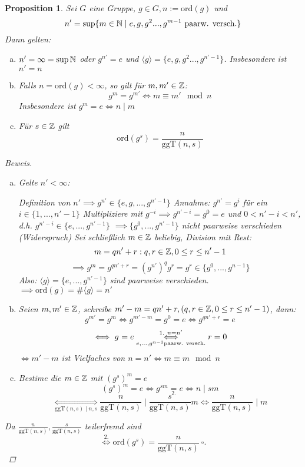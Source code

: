 \documentclass[a4paper]{article}
\theoremstyle{plain}
\newtheorem{prop}[thm]{Proposition}
\theoremstyle{definition}
\begin{document}
\begin{prop} %
Sei $G$ eine Gruppe, $g \in G, n := \mathrm{ord}(g)$ und
$$n' = \sup\{m \in \Bbb N \mid e, g, g^{2} ..., g^{m-1} \text{ paarw. versch.}\}$$
Dann gelten:
\begin{enumerate}[(a)]
\item $n' = \infty = \sup \Bbb N$ oder $g^{n'} = e$ und $\langle g \rangle= \{e, g, g^{2} ..., g^{n'-1}\}$. Insbesondere ist $n'=n$
\item Falls $n = \mathrm{ord}(g) < \infty$, so gilt für $m,m' \in \Bbb Z$: $$g^{m} = g^{m'} \iff m \equiv m' \mod n$$
    Insbesondere ist $g^{m} = e \iff n \mid m$
\item Für $s \in \Bbb Z$ gilt $$\mathrm{ord}(g^{s}) = \frac{n}{\mathrm{ggT}(n,s)}$$
\end{enumerate}
\begin{proof}[Beweis]
  \item
  \begin{enumerate}[(a)]
    \item Gelte $n' < \infty$:

Definition von $n' \implies g^{n'} \in \{e, g, ..., g^{n'-1}\}$
Annahme: $g^{n'} = g^{i}$ für ein $i \in \{1, ..., n'-1\}$
Multipliziere mit $g^{-i} \implies g^{n'-i} = g^{0} = e$ und
$0 < n' - i < n'$, d.h. $g^{n'-i} \in \{e, ..., g^{n'-1}\}$
$\implies \{g^{0}, ..., g^{n'-1}\}$ nicht paarweise verschieden (Widerspruch)
Sei schließlich $m \in \Bbb Z$ beliebig, Division mit Rest: $$m = qn' + r : q,r \in \Bbb Z , 0 \le r \le n' - 1$$
$$\implies g^{m} = g^{qn'+r} = (g^{n'})^{q}g^{r} = g^{r} \in \{g^{0}, ..., g^{n-1}\}$$
Also: $\langle g \rangle = \{e, ..., g^{n'-1}\}$ sind paarweise verschieden. $\implies \mathrm{ord}(g) = \# \langle g \rangle = n'$
\item Seien $m, m' \in \Bbb Z$, schreibe $m'-m = qn'+r, (q, r \in \Bbb Z, 0 \le r \le n'-1)$, dann:
$$g^{m'} = g^{m} \iff g^{m'-m} = g^{0} = e \iff g^{qn'+r} = e$$
$$\iff g^{} = e \overunderset{1.\  n = n'}{e, ..., g^{n-1} \text{paarw. versch.}}\iff r = 0$$
$\iff m' - m$ ist Vielfaches von $n=n' \iff m \equiv m \mod n$
\item Bestime die $m \in \Bbb Z$ mit $(g^{s})^{m} = e$
$$(g^{s})^{m} = e \iff g^{sm} \underset{2.}= e \iff n \mid sm$$
$$\underset{\mathrm{ggT}(n,s) \mid n,s}\iff \frac n{\mathrm{ggT}(n,s)} \mid \frac s{\mathrm{ggT}(n,s)}m \iff \frac{n}{\mathrm{ggT}(n,s)} \mid m$$

  \end{enumerate}

Da $\frac n{\mathrm{ggT}(n,s)},  \frac s{\mathrm{ggT}(n,s)}$ teilerfremd sind
$$\overset{2. }\iff \mathrm{ord}(g^{s}) = \frac n{\mathrm{ggT}(n,s)} \ \square.$$
\end{proof}
\end{prop}
\end{document}
